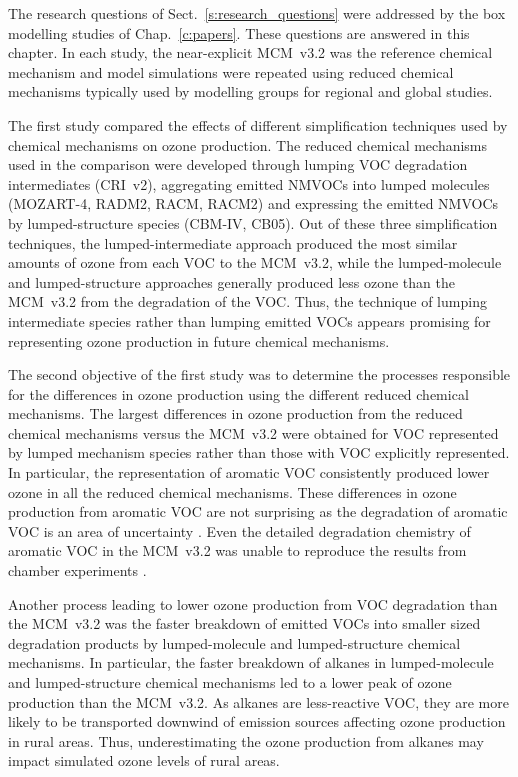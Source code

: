 The research questions of Sect.~\ref{s:research_questions} were addressed by the box modelling studies of Chap.~\ref{c:papers}. 
These questions are answered in this chapter.
In each study, the near-explicit MCM~v3.2 was the reference chemical mechanism and model simulations were repeated using reduced chemical mechanisms typically used by modelling groups for regional and global studies.

The first study compared the effects of different simplification techniques used by chemical mechanisms on ozone production.
The reduced chemical mechanisms used in the comparison were developed through lumping VOC degradation intermediates (CRI~v2), aggregating emitted NMVOCs into lumped molecules (MOZART-4, RADM2, RACM, RACM2) and expressing the emitted NMVOCs by lumped-structure species (CBM-IV, CB05).
Out of these three simplification techniques, the lumped-intermediate approach produced the most similar amounts of ozone from each VOC to the MCM~v3.2, while the lumped-molecule and lumped-structure approaches generally produced less ozone than the MCM~v3.2 from the degradation of the VOC.
Thus, the technique of lumping intermediate species rather than lumping emitted VOCs appears promising for representing ozone production in future chemical mechanisms.

The second objective of the first study was to determine the processes responsible for the differences in ozone production using the different reduced chemical mechanisms.
The largest differences in ozone production from the reduced chemical mechanisms versus the MCM~v3.2 were obtained for VOC represented by lumped mechanism species rather than those with VOC explicitly represented.
In particular, the representation of aromatic VOC consistently produced lower ozone in all the reduced chemical mechanisms.
These differences in ozone production from aromatic VOC are not surprising as the degradation of aromatic VOC is an area of uncertainty \citep{Atkinson:2003}.
Even the detailed degradation chemistry of aromatic VOC in the MCM~v3.2 was unable to reproduce the results from chamber experiments \citep{Bloss:2005}.

Another process leading to lower ozone production from VOC degradation than the MCM~v3.2 was the faster breakdown of emitted VOCs into smaller sized degradation products by lumped-molecule and lumped-structure chemical mechanisms.
In particular, the faster breakdown of alkanes in lumped-molecule and lumped-structure chemical mechanisms led to a lower peak of ozone production than the MCM~v3.2.
As alkanes are less-reactive VOC, they are more likely to be transported downwind of emission sources affecting ozone production in rural areas.
Thus, underestimating the ozone production from alkanes may impact simulated ozone levels of rural areas.

